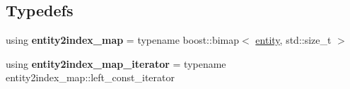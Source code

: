 \subsection*{Typedefs}
\begin{DoxyCompactItemize}
\item 
\hypertarget{namespaceophidian_1_1entity_a04047b2fa4b7565ff29a7348b5e9802c}{using {\bfseries entity2index\-\_\-map} = typename boost\-::bimap$<$ \hyperlink{classophidian_1_1entity_1_1entity}{entity}, std\-::size\-\_\-t $>$}\label{namespaceophidian_1_1entity_a04047b2fa4b7565ff29a7348b5e9802c}

\item 
\hypertarget{namespaceophidian_1_1entity_ab3e8dabd72c5e93db198dc1488cda606}{using {\bfseries entity2index\-\_\-map\-\_\-iterator} = typename entity2index\-\_\-map\-::left\-\_\-const\-\_\-iterator}\label{namespaceophidian_1_1entity_ab3e8dabd72c5e93db198dc1488cda606}

\end{DoxyCompactItemize}
